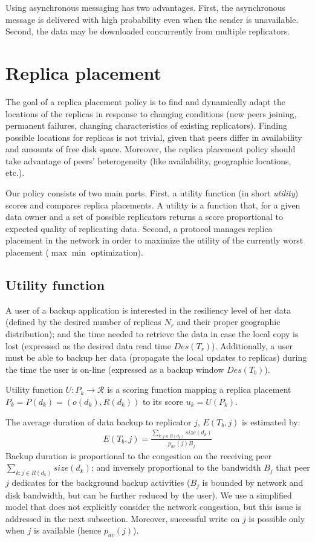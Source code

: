 \documentclass[10pt, final, conference, letterpaper]{IEEEtran}
\begin{document}
Using asynchronous messaging has two advantages. First, the asynchronous message is delivered with high probability even when the sender is unavailable. Second, the data may be downloaded concurrently from multiple replicators.

\section{Replica placement}\label{sec::replica-placement}
The goal of a replica placement policy is to find and dynamically adapt the locations of the replicas in response to changing conditions (new peers joining, permanent failures, changing characteristics of existing replicators).  
Finding possible locations for replicas is not trivial, given that peers differ in availability and amounts of free disk space.
Moreover, the replica placement policy should take advantage of peers' heterogeneity (like availability, geographic locations, etc.). 

Our policy consists of two main parts.
First, a utility function (in short \emph{utility}) scores and compares replica placements. A utility is a function that, for a given data owner and a set of possible replicators returns a score proportional to expected quality of replicating data.
Second, a protocol manages replica placement in the network in order to maximize the utility of the currently worst placement ($\max \min$ optimization).

\subsection{Utility function}\label{sec::utility-function}

A user of a backup application is interested in the resiliency level of her data (defined by the desired number of replicas $N_{r}$ and their proper geographic distribution); 
and the time needed to retrieve the data in case the local copy is lost (expressed as the desired data read time $Des(T_{r})$). Additionally, a user must be able to backup her data (propagate the local updates to replicas) during the time the user is on-line (expressed as a backup window $Des(T_b)$).

Utility function $U: P_k \to \mathcal{R}$ is a scoring function mapping a replica placement $P_k = P(d_k) = (o(d_k), R(d_k))$ to its score $u_k = U(P_k)$.

The average duration of data backup to replicator $j$, $E(T_b, j)$ is estimated by:
\begin{align}\label{eq::backup-duration}
E(T_b, j) = \frac{\sum_{k:j \in R(d_k)}{size(d_k)}}{p_{av}(j)B_{j}}
\end{align}
Backup duration is proportional to the congestion on the receiving peer $\sum_{k:j \in R(d_k)}{size(d_k)}$; and inversely proportional to the bandwidth $B_j$ that peer $j$ dedicates for the background backup activities ($B_j$ is bounded by network and disk bandwidth, but can be further reduced by the user). We use a simplified model that does not explicitly consider the network congestion, but this issue is addressed in the next subsection. Moreover, successful write on $j$ is possible only when $j$ is available (hence $p_{av}(j)$).
\end{document}
